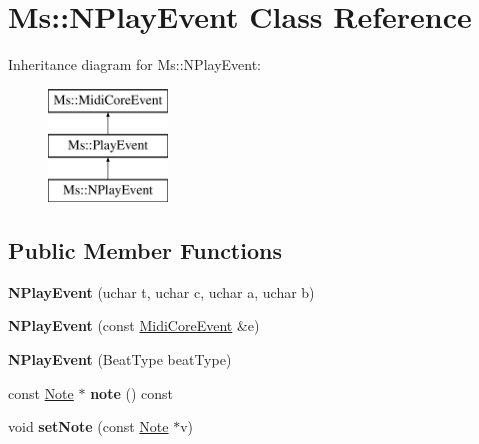 \hypertarget{class_ms_1_1_n_play_event}{}\section{Ms\+:\+:N\+Play\+Event Class Reference}
\label{class_ms_1_1_n_play_event}
Inheritance diagram for Ms\+:\+:N\+Play\+Event\+:\begin{figure}[H]
\begin{center}
\leavevmode
\includegraphics[height=3.000000cm]{class_ms_1_1_n_play_event}
\end{center}
\end{figure}
\subsection*{Public Member Functions}
\begin{DoxyCompactItemize}
\item 
\mbox{\label{class_ms_1_1_n_play_event_a60c0ca433c9550525ea673002b3f401b}} 
{\bfseries N\+Play\+Event} (uchar t, uchar c, uchar a, uchar b)
\item 
\mbox{\label{class_ms_1_1_n_play_event_ab3087cb1ae4c21dd750fe91fe4dc36af}} 
{\bfseries N\+Play\+Event} (const \hyperlink{class_ms_1_1_midi_core_event}{Midi\+Core\+Event} \&e)
\item 
\mbox{\label{class_ms_1_1_n_play_event_accf7c49d8b3d8445c1b3fe2e2790e66f}} 
{\bfseries N\+Play\+Event} (Beat\+Type beat\+Type)
\item 
\mbox{\label{class_ms_1_1_n_play_event_a931c1874cf4ece8d07ab5f35ac15cf02}} 
const \hyperlink{class_ms_1_1_note}{Note} $\ast$ {\bfseries note} () const
\item 
\mbox{\label{class_ms_1_1_n_play_event_a2a677508fc17915641123db72628d812}} 
void {\bfseries set\+Note} (const \hyperlink{class_ms_1_1_note}{Note} $\ast$v)
\end{DoxyCompactItemize}
